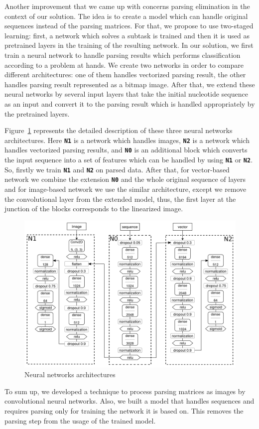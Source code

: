 Another improvement that we came up with concerns parsing elimination in the context of our solution. 
The idea is to create a model which can handle original sequences instead of the parsing matrices. For that, we propose to use two-staged learning: first, a network which solves a subtask is trained and then it is used as pretrained layers in the training of the resulting network.
In our solution, we first train a neural network to handle parsing results which performs classification according to a problem at hands. We create two networks in order to compare different architectures: one of them handles vectorized parsing result, the other handles parsing result represented as a bitmap image. After that, we extend these neural networks by several input layers that take the initial nucleotide sequence as an input and convert it to the parsing result which is handled appropriately by the pretrained layers.

Figure~\ref{nn} represents the detailed description of these three neural networks architectures.
Here \textbf{\texttt{N1}} is a network which handles images, \textbf{\texttt{N2}} is a network which handles vectorized parsing results, and \textbf{\texttt{N0}} is an additional block which converts the input sequence into a set of features which can be handled by using \textbf{\texttt{N1}} or \textbf{\texttt{N2}}. So, firstly we train \textbf{\texttt{N1}} and \textbf{\texttt{N2}} on parsed data. After that, for vector-based network we combine the extension \textbf{\texttt{N0}} and the whole original sequence of layers and for image-based network we use the similar architecture, except we remove the convolutional layer from the extended model, thus, the first layer at the junction of the blocks corresponds to the linearized image.

\begin{figure}[h]
\begin{center}
\centering
\includegraphics[width=12cm]{figures/nn_arch.pdf}
\caption{Neural networks architectures}
\label{nn}
\end{center}
\end{figure}

To sum up, we developed a technique to process parsing matrices as images by convolutional neural networks. 
Also, we built a model that handles sequences and requires parsing only for training the network it is based on. 
This removes the parsing step from the usage of the trained model.
